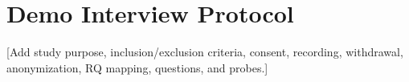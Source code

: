 \section{Demo Interview Protocol}

\proposed{} [Add study purpose, inclusion/exclusion criteria, consent, recording, withdrawal, anonymization, RQ mapping, questions, and probes.]
